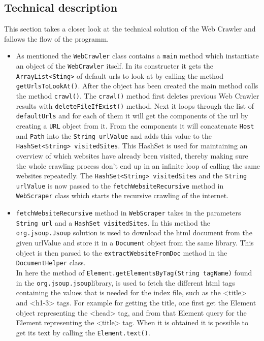 \subsection{Technical description}
This section takes a closer look at the technical solution of the Web Crawler and fallows the flow of the programm.
\begin{itemize}
    \item As mentioned the {\tt WebCrawler} class contains a {\tt main} method which instantiate an object of the {\tt WebCrawler} itself. In its constructer it gets the {\tt ArrayList<Sting>} of default urls to look at by calling the method {\tt getUrlsToLookAt()}. After the object has been created the main method calls the method {\tt crawl()}.
    The {\tt crawl()} method first deletes previous Web Crawler results with  {\tt deleteFileIfExist()} method. Next it loops through the list of {\tt defaultUrls} and for each of them it will get the components of the url by creating a {\tt URL} object from it. From the components it will concatenate {\tt Host} and {\tt Path} into the {\tt String urlValue} and adds this value to the {\tt HashSet<String> visitedSites}. This HashSet is used for maintaining an overview of which websites have already been visited, thereby making sure the whole crawling process don’t end up in an infinite loop of calling the same websites repeatedly. The {\tt HashSet<String> visitedSites} and the {\tt String urlValue} is now passed to the {\tt fetchWebsiteRecursive} method in {\tt WebScraper} class which starts the recursive crawling of the internet.
    \item {\tt fetchWebsiteRecursive} method in {\tt WebScraper} takes in the parameters {\tt String url} and a {\tt HashSet visitedSites}. In this method the {\tt org.jsoup.Jsoup} solution is used to  download the html document from the given urlValue and store it in a {\tt Document} object from the same library. This object is then parsed to the {\tt extractWebsiteFromDoc} method in the {\tt DocumentHelper} class.\\
    In here the method of {\tt Element.getElementsByTag(String tagName)} found in the {\tt org.jsoup.jsoup}\footnotemark library, is used to fetch the different html tags containing the values that is needed for the index file, such as the <title> and <h1-3> tags. For example for getting the title, one first get the Element object representing the <head> tag, and from that Element query for the Element representing the <title> tag. When it is obtained it is possible to get its text by calling the {\tt Element.text()}.

\end{itemize}
